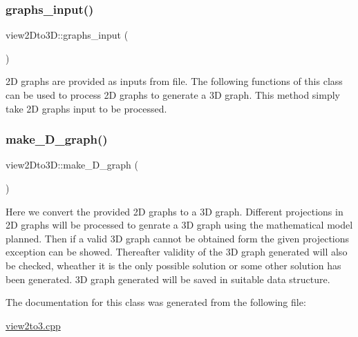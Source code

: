 \mbox{\label{classview2Dto3D_aeaf8d04a7b6dee4c61a791ddae2d4add}} 
\subsubsection{\texorpdfstring{graphs\+\_\+input()}{graphs\_input()}}
{\footnotesize\ttfamily view2\+Dto3\+D\+::graphs\+\_\+input (\begin{DoxyParamCaption}{ }\end{DoxyParamCaption})\hspace{0.3cm}{\ttfamily [inline]}}

2D graphs are provided as inputs from file. The following functions of this class can be used to process 2D graphs to generate a 3D graph. This method simply take 2D graphs input to be processed.\mbox{\label{classview2Dto3D_a9bb5691d1dae21c9f0fe2573c04db1da}} 
\subsubsection{\texorpdfstring{make\+\_\+D\+\_\+graph()}{make\_3D\_graph()}}
{\footnotesize\ttfamily view2\+Dto3\+D\+::make\+\_\+D\+\_\+graph (\begin{DoxyParamCaption}{ }\end{DoxyParamCaption})\hspace{0.3cm}{\ttfamily [inline]}}

Here we convert the provided 2D graphs to a 3D graph. Different projections in 2D graphs will be processed to genrate a 3D graph using the mathematical model planned. Then if a valid 3D graph cannot be obtained form the given projections exception can be showed. Thereafter validity of the 3D graph generated will also be checked, wheather it is the only possible solution or some other solution has been generated. 3D graph generated will be saved in suitable data structure.

The documentation for this class was generated from the following file\+:\begin{DoxyCompactItemize}
\item 
\hyperlink{view2to3_8cpp}{view2to3.\+cpp}\end{DoxyCompactItemize}
